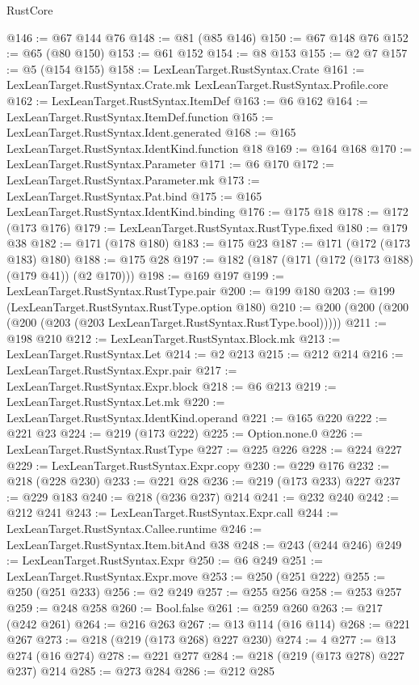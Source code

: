 \begin{lexlean}{RustCore}
\begin{coremodule}
@146 := @67 @144 @76
@148 := @81 (@85 @146)
@150 := @67 @148 @76
@152 := @65 (@80 @150)
@153 := @61 @152
@154 := @8 @153
@155 := @2 @7
@157 := @5 (@154 @155)
@158 := LexLeanTarget.RustSyntax.Crate
@161 := LexLeanTarget.RustSyntax.Crate.mk LexLeanTarget.RustSyntax.Profile.core
@162 := LexLeanTarget.RustSyntax.ItemDef
@163 := @6 @162
@164 := LexLeanTarget.RustSyntax.ItemDef.function
@165 := LexLeanTarget.RustSyntax.Ident.generated
@168 := @165 LexLeanTarget.RustSyntax.IdentKind.function @18
@169 := @164 @168
@170 := LexLeanTarget.RustSyntax.Parameter
@171 := @6 @170
@172 := LexLeanTarget.RustSyntax.Parameter.mk
@173 := LexLeanTarget.RustSyntax.Pat.bind
@175 := @165 LexLeanTarget.RustSyntax.IdentKind.binding
@176 := @175 @18
@178 := @172 (@173 @176)
@179 := LexLeanTarget.RustSyntax.RustType.fixed
@180 := @179 @38
@182 := @171 (@178 @180)
@183 := @175 @23
@187 := @171 (@172 (@173 @183) @180)
@188 := @175 @28
@197 := @182 (@187 (@171 (@172 (@173 @188) (@179 @41)) (@2 @170)))
@198 := @169 @197
@199 := LexLeanTarget.RustSyntax.RustType.pair
@200 := @199 @180
@203 := @199 (LexLeanTarget.RustSyntax.RustType.option @180)
@210 := @200 (@200 (@200 (@200 (@203 (@203 LexLeanTarget.RustSyntax.RustType.bool)))))
@211 := @198 @210
@212 := LexLeanTarget.RustSyntax.Block.mk
@213 := LexLeanTarget.RustSyntax.Let
@214 := @2 @213
@215 := @212 @214
@216 := LexLeanTarget.RustSyntax.Expr.pair
@217 := LexLeanTarget.RustSyntax.Expr.block
@218 := @6 @213
@219 := LexLeanTarget.RustSyntax.Let.mk
@220 := LexLeanTarget.RustSyntax.IdentKind.operand
@221 := @165 @220
@222 := @221 @23
@224 := @219 (@173 @222)
@225 := Option.none.{0}
@226 := LexLeanTarget.RustSyntax.RustType
@227 := @225 @226
@228 := @224 @227
@229 := LexLeanTarget.RustSyntax.Expr.copy
@230 := @229 @176
@232 := @218 (@228 @230)
@233 := @221 @28
@236 := @219 (@173 @233) @227
@237 := @229 @183
@240 := @218 (@236 @237) @214
@241 := @232 @240
@242 := @212 @241
@243 := LexLeanTarget.RustSyntax.Expr.call
@244 := LexLeanTarget.RustSyntax.Callee.runtime
@246 := LexLeanTarget.RustSyntax.Item.bitAnd @38
@248 := @243 (@244 @246)
@249 := LexLeanTarget.RustSyntax.Expr
@250 := @6 @249
@251 := LexLeanTarget.RustSyntax.Expr.move
@253 := @250 (@251 @222)
@255 := @250 (@251 @233)
@256 := @2 @249
@257 := @255 @256
@258 := @253 @257
@259 := @248 @258
@260 := Bool.false
@261 := @259 @260
@263 := @217 (@242 @261)
@264 := @216 @263
@267 := @13 @114 (@16 @114)
@268 := @221 @267
@273 := @218 (@219 (@173 @268) @227 @230)
@274 := 4
@277 := @13 @274 (@16 @274)
@278 := @221 @277
@284 := @218 (@219 (@173 @278) @227 @237) @214
@285 := @273 @284
@286 := @212 @285

\end{coremodule}
\end{lexlean}
